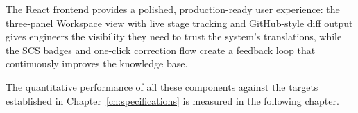 The React frontend provides a polished, production-ready user experience: the
three-panel Workspace view with live stage tracking and GitHub-style diff output
gives engineers the visibility they need to trust the system's translations,
while the SCS badges and one-click correction flow create a feedback loop that
continuously improves the knowledge base.

The quantitative performance of all these components against the targets
established in Chapter~\ref{ch:specifications} is measured in the following
chapter.

%
